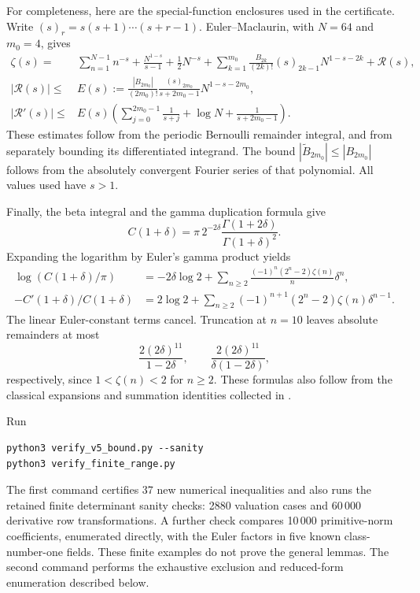 \documentclass[11pt]{article}
\begin{document}
For completeness, here are the special-function enclosures used in
the certificate. Write \((s)_r=s(s+1)\cdots(s+r-1)\).
Euler--Maclaurin, with \(N=64\) and \(m_0=4\), gives
\begin{align*}
 \zeta(s)={}&\sum_{n=1}^{N-1}n^{-s}+\frac{N^{1-s}}{s-1}
 +\frac12N^{-s}
 +\sum_{k=1}^{m_0}\frac{B_{2k}}{(2k)!}(s)_{2k-1}
                 N^{1-s-2k}+\mathcal R(s),\\
 |\mathcal R(s)|\le{}&
 E(s):=\frac{|B_{2m_0}|}{(2m_0)!}
       \frac{(s)_{2m_0}}{s+2m_0-1}N^{1-s-2m_0},\\
 |\mathcal R'(s)|\le{}&
 E(s)\left(\sum_{j=0}^{2m_0-1}\frac1{s+j}
             +\log N+\frac1{s+2m_0-1}\right).
\end{align*}
These estimates follow from the periodic Bernoulli remainder integral,
and from separately bounding its differentiated integrand.
The bound \(|\widetilde B_{2m_0}|\le |B_{2m_0}|\) follows from the
absolutely convergent Fourier series of that polynomial.
All values used have \(s>1\).

Finally, the beta integral and the gamma duplication formula give
\[
 C(1+\delta)=
 \pi\,2^{-2\delta}
 \frac{\Gamma(1+2\delta)}{\Gamma(1+\delta)^2}.
\]
Expanding the logarithm by Euler's gamma product yields
\begin{align*}
 \log(C(1+\delta)/\pi)
 &=-2\delta\log2+
   \sum_{n\ge2}\frac{(-1)^n(2^n-2)\zeta(n)}{n}\delta^n,\\
 -C'(1+\delta)/C(1+\delta)
 &=2\log2+
   \sum_{n\ge2}(-1)^{n+1}(2^n-2)\zeta(n)\delta^{n-1}.
\end{align*}
The linear Euler-constant terms cancel. Truncation at \(n=10\)
leaves absolute remainders at most
\[
 \frac{2(2\delta)^{11}}{1-2\delta},\qquad
 \frac{2(2\delta)^{11}}{\delta(1-2\delta)},
\]
respectively, since \(1<\zeta(n)<2\) for \(n\ge2\).
These formulas also follow from the classical expansions and
summation identities collected in \cite{dlmf}.

Run
\begin{verbatim}
python3 verify_v5_bound.py --sanity
python3 verify_finite_range.py
\end{verbatim}
The first command certifies 37 new numerical inequalities and also
runs the retained finite determinant sanity checks: 2880 valuation
cases and 60\,000 derivative row transformations. A further check
compares 10\,000 primitive-norm coefficients, enumerated directly,
with the Euler factors in five known class-number-one fields.
These finite examples do not prove the general lemmas. The second command performs
the exhaustive exclusion and reduced-form enumeration described below.
\end{document}
